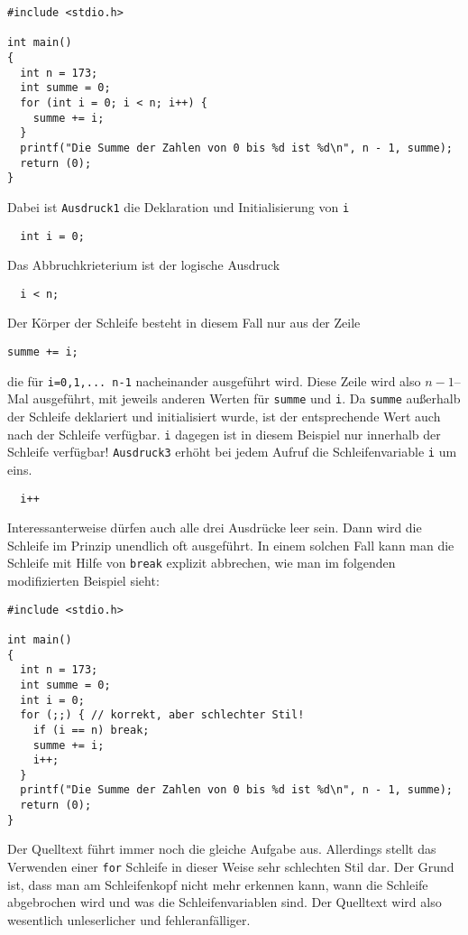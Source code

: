 \begin{minipage}{\linewidth}
\begin{lstlisting}
#include <stdio.h>

int main()
{
  int n = 173;
  int summe = 0;
  for (int i = 0; i < n; i++) {
    summe += i;
  }
  printf("Die Summe der Zahlen von 0 bis %d ist %d\n", n - 1, summe);
  return (0);
}
\end{lstlisting}
\end{minipage}
Dabei ist \texttt{Ausdruck1} die Deklaration und Initialisierung von \verb|i|
\begin{lstlisting}
  int i = 0;
\end{lstlisting}
Das Abbruchkrieterium ist der logische Ausdruck
\begin{lstlisting}
  i < n;
\end{lstlisting}
Der Körper der Schleife besteht in diesem Fall nur aus der Zeile
\begin{lstlisting}
summe += i;
\end{lstlisting}
die für \verb|i=0,1,... n-1| nacheinander ausgeführt wird.
Diese Zeile wird also $n-1$--Mal ausgeführt, mit jeweils anderen Werten für \verb|summe| und \verb|i|.
Da \verb|summe| außerhalb der Schleife deklariert und initialisiert wurde, ist der entsprechende Wert auch nach der Schleife verfügbar.
\verb|i| dagegen ist in diesem Beispiel nur innerhalb der Schleife verfügbar!
\texttt{Ausdruck3} erhöht bei jedem Aufruf die Schleifenvariable \verb|i| um eins.
\begin{lstlisting}
  i++
\end{lstlisting}
Interessanterweise dürfen auch alle drei Ausdrücke leer sein.
Dann wird die Schleife im Prinzip unendlich oft ausgeführt.
In einem solchen Fall kann man die Schleife mit Hilfe von \verb|break| explizit abbrechen, wie man im folgenden modifizierten Beispiel sieht:

\begin{minipage}{\linewidth}
\begin{lstlisting}
#include <stdio.h>

int main()
{
  int n = 173;
  int summe = 0;
  int i = 0;
  for (;;) { // korrekt, aber schlechter Stil!
    if (i == n) break;
    summe += i;
    i++;
  }
  printf("Die Summe der Zahlen von 0 bis %d ist %d\n", n - 1, summe);
  return (0);
}
\end{lstlisting}
\end{minipage}
Der Quelltext führt immer noch die gleiche Aufgabe aus. 
Allerdings stellt das Verwenden einer \texttt{for} Schleife in dieser Weise sehr schlechten Stil dar.
Der Grund ist, dass man am Schleifenkopf nicht mehr erkennen kann, wann die Schleife abgebrochen wird und was die Schleifenvariablen sind.
Der Quelltext wird also wesentlich unleserlicher und fehleranfälliger.

